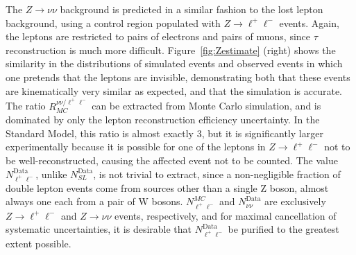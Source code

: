    The $Z\rightarrow \nu\nu$ background is predicted in a similar fashion to the lost lepton background, using a control region populated with $Z\rightarrow \ell^+\ell^-$ events.
    Again, the leptons are restricted to pairs of electrons and pairs of muons, since $\tau$ reconstruction is much more difficult.    
    Figure~\ref{fig:Zestimate} (right) shows the similarity in the \mttwo distributions of simulated \znunu events and observed \zll events in which one pretends that the leptons are invisible, demonstrating both that these events are kinematically very similar as expected, and that the simulation is accurate.
    The ratio $R_{MC}^{\nu\nu/\ell^+\ell^-}$ can be extracted from Monte Carlo simulation, and is dominated by only the lepton reconstruction efficiency uncertainty.
    In the Standard Model, this ratio is almost exactly 3, but it is significantly larger experimentally because it is possible for one of the leptons in $Z\rightarrow\ell^+\ell^-$ not to be well-reconstructed, causing the affected event not to be counted.
    The value $N_{\ell^+\ell^-}^{\mathrm{Data}}$, unlike $N_{SL}^{\mathrm{Data}}$, is not trivial to extract, since a non-negligible fraction of double lepton events come from sources other than a single Z boson, 
    almost always one each from a pair of W bosons.
    $N_{\ell^+\ell^-}^{MC}$ and $N_{\nu\nu}^{\mathrm{Data}}$ are exclusively $Z\rightarrow \ell^+\ell^-$ and $Z\rightarrow\nu\nu$ events, respectively, and for maximal cancellation of systematic uncertainties, it is desirable that $N_{\ell^+\ell^-}^{\mathrm{Data}}$ be purified to the greatest extent possible.

